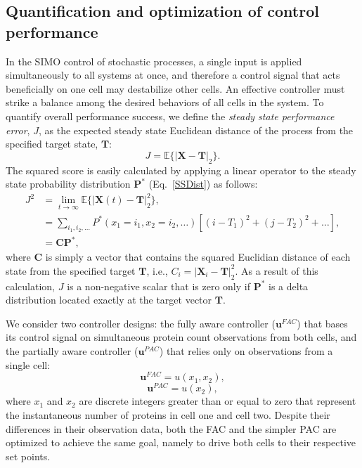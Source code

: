 \documentclass[12pt]{iopart}
\begin{document}
\michael[ok!]

\subsection{Quantification and optimization of control performance}\label{sec:Quantification}
In the SIMO control of stochastic processes, a single input is applied simultaneously to all systems at once, and therefore a control signal that acts beneficially on one cell may destabilize other cells. 
An effective controller must strike a balance among the desired behaviors of all cells in the system. 
To quantify overall performance success, we define the {\em steady state performance error}, $J$, as the expected steady state Euclidean distance of the process from the specified target state, $\mathbf{T}$:
 \begin{equation}
 J = \mathbb{E}\{|\mathbf{X}-\mathbf{T}|_2\}.
 \end{equation}
The squared score is easily calculated by applying a linear operator to the steady state probability distribution $\mathbf{P}^*$ (Eq.\ \ref{SSDist}) as follows:
\begin{eqnarray}
J^2&= \lim_{t\rightarrow \infty}\mathbb{E}\{|\mathbf{X}(t)-\mathbf{T}|_2^2\}, \nonumber \\ 
&=\sum_{i_1,i_2,\ldots} P^*(x_1=i_1,x_2=i_2,\ldots) \left[(i- T_1)^2 + (j- T_2)^2 +\ldots\right],\nonumber  \\
&=\mathbf{C}\mathbf{P}^*,
\label{Euclid} 
\end{eqnarray}
where $\mathbf{C}$ is simply a vector that contains the squared Euclidian distance of each state from the specified target $\mathbf{T}$, i.e., $C_i = |\mathbf{X}_i-\mathbf{T}|_2^2$. 
As a result of this calculation, $J$ is a non-negative scalar that is zero only if $\mathbf{P}^*$ is a delta distribution located exactly at the target vector $\mathbf{T}$.

We consider two controller designs: the fully aware controller ($\mathbf{u}^{FAC}$) that bases its control signal on simultaneous protein count observations from both cells, and the partially aware controller ($\mathbf{u}^{PAC}$) that relies only on observations from a single cell:
\begin{equation}
\mathbf{u}^{FAC}=u(x_1,x_2),
\end{equation}
\begin{equation}
\mathbf{u}^{PAC}=u(x_2),
\end{equation}
where $x_1$ and $x_2$ are discrete integers greater than or equal to zero that represent the instantaneous number of proteins in cell one and cell two. Despite their differences in their observation data, both the FAC and the simpler PAC are optimized to achieve the same goal, namely to drive both cells to their respective set points.
\end{document}
